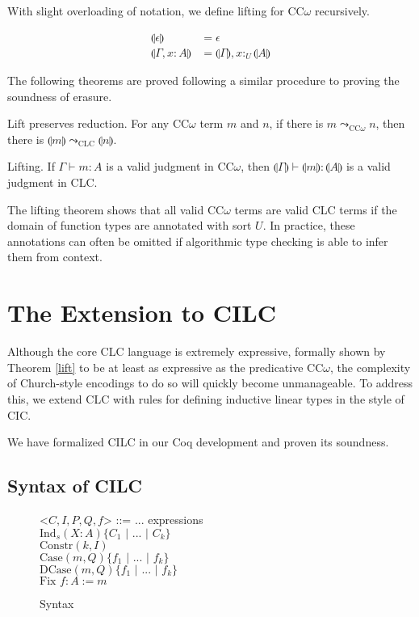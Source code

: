 \documentclass[sigplan,screen,review,anonymous]{acmart}
\newcommand{\indalt}[1][2]{\\\hspace*{-1.2em}\textbar\quad}
\newcommand{\ind}[1]{\text{Ind}_{#1}}
\newcommand{\constr}{\text{Constr}}
\newcommand{\case}{\text{Case}}
\newcommand{\dcase}{\text{DCase}}
\newcommand{\fix}{\text{Fix }}
\newcommand{\sep}{\text{ | }}
\newcommand{\utype}{:_{\scriptscriptstyle U}}
\newcommand{\step}{\leadsto}
\newcommand{\lift}[1]{\llparenthesis #1 \rrparenthesis}
\begin{document}
With slight overloading of notation, we define lifting for CC$\omega$ recursively.
\begin{definition}
  \begin{align*}
    \lift{\epsilon}      & = \epsilon                         \\
    \lift{\Gamma, x : A} & = \lift{\Gamma}, x \utype \lift{A}
  \end{align*}
\end{definition}

The following theorems are proved following a similar procedure to proving the soundness of erasure.
\begin{theorem}
  Lift preserves reduction. For any CC$\omega$ term $m$ and $n$, if there is $m \step_{\scriptscriptstyle \text{CC}\omega} n$, then there is $\lift{m} \step_{\scriptscriptstyle \text{CLC}} \lift{n}$.
\end{theorem}

\begin{theorem} \label{lift}
  Lifting. If $\Gamma \vdash m : A$ is a valid judgment in CC$\omega$, then $\lift{\Gamma} \vdash \lift{m} : \lift{A}$ is a valid judgment in CLC.
\end{theorem}

The lifting theorem shows that all valid CC$\omega$ terms are valid CLC terms if the domain of function types are annotated with sort $U$. In practice, these annotations can often be omitted if algorithmic type checking is able to infer them from context.

\section{The Extension to CILC}
Although the core CLC language is extremely expressive, formally shown by Theorem \ref{lift} to be at least as expressive as the predicative CC$\omega$, the complexity of Church-style encodings to do so will quickly become unmanageable. To address this, we extend CLC with rules for defining inductive linear types in the style of CIC.

We have formalized CILC in our Coq development and proven its soundness.

\subsection{Syntax of CILC}
\begin{figure}[h]
  \caption{Syntax}
  \begin{grammar}
    <$C,I,P,Q,f$> ::= ... \hspace*{10em} expressions
    \indalt $\ind{s}(X : A)\{C_1 \sep ... \sep C_k\}$
    \indalt $\constr(k, I)$
    \indalt $\case(m, Q)\{f_1 \sep ... \sep f_k \}$
    \indalt $\dcase(m, Q)\{f_1 \sep ... \sep f_k \}$
    \indalt $\fix f : A := m$
  \end{grammar}
  \Description{}
  \label{syntax2}
\end{figure}
\end{document}
